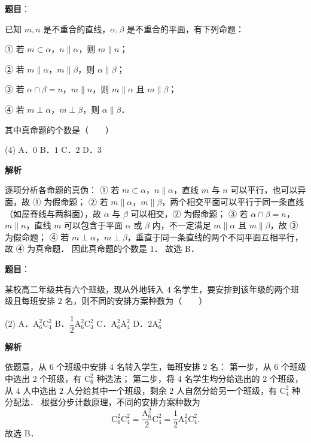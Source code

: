 \begin{answer}

\textbf{题目}：

已知 $m, n$ 是不重合的直线，$\alpha, \beta$ 是不重合的平面，有下列命题：

① 若 $m \subset \alpha$，$n \parallel \alpha$，则 $m \parallel n$；

② 若 $m \parallel \alpha$，$m \parallel \beta$，则 $\alpha \parallel \beta$；

③ 若 $\alpha \cap \beta = n$，$m \parallel n$，则 $m \parallel \alpha$ 且 $m \parallel \beta$；

④ 若 $m \perp \alpha$，$m \perp \beta$，则 $\alpha \parallel \beta$．

其中真命题的个数是\mbox{（　　）}

\begin{gkopts}(4)
\task A．$0$
\task B．$1$
\task C．$2$
\task D．$3$
\end{gkopts}

\textbf{解析}

逐项分析各命题的真伪：
① 若 $m \subset \alpha$，$n \parallel \alpha$，直线 $m$ 与 $n$ 可以平行，也可以异面，故 ① 为假命题；
② 若 $m \parallel \alpha$，$m \parallel \beta$，两个相交平面可以平行于同一条直线（如屋脊线与两斜面），故 $\alpha$ 与 $\beta$ 可以相交，② 为假命题；
③ 若 $\alpha \cap \beta = n$，$m \parallel n$，直线 $m$ 可以包含于平面 $\alpha$ 或 $\beta$ 内，不一定满足 $m \parallel \alpha$ 且 $m \parallel \beta$，故 ③ 为假命题；
④ 若 $m \perp \alpha$，$m \perp \beta$，垂直于同一条直线的两个不同平面互相平行，故 ④ 为真命题．
因此真命题的个数是 $1$．
故选 B．


\end{answer}
\begin{answer}

\textbf{题目}：

某校高二年级共有六个班级，现从外地转入 $4$ 名学生，要安排到该年级的两个班级且每班安排 $2$ 名，则不同的安排方案种数为\mbox{（　　）}

\begin{gkopts}(2)
\task A．$\mathrm{A}_6^2 \mathrm{C}_4^2$
\task B．$\dfrac{1}{2}\mathrm{A}_6^2 \mathrm{C}_4^2$
\task C．$\mathrm{A}_6^2 \mathrm{A}_4^2$
\task D．$2\mathrm{A}_6^2$
\end{gkopts}

\textbf{解析}

依题意，从 $6$ 个班级中安排 $4$ 名转入学生，每班安排 $2$ 名：
第一步，从 $6$ 个班级中选出 $2$ 个班级，有 $\mathrm{C}_6^2$ 种选法；
第二步，将 $4$ 名学生均分给选出的 $2$ 个班级，从 $4$ 人中选出 $2$ 人分给其中一个班级，剩余 $2$ 人自然分给另一个班级，有 $\mathrm{C}_4^2$ 种分配法．
根据分步计数原理，不同的安排方案种数为
\nopagebreak[4]
\[
\mathrm{C}_6^2 \mathrm{C}_4^2 = \frac{\mathrm{A}_6^2}{2} \mathrm{C}_4^2 = \frac{1}{2}\mathrm{A}_6^2 \mathrm{C}_4^2.
\]
故选 B．


\end{answer}
